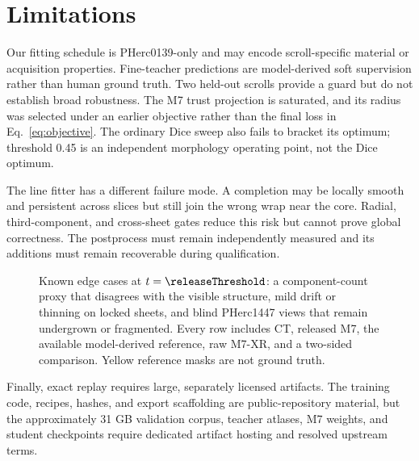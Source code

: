 \section{Limitations}
\label{sec:limitations}

Our fitting schedule is PHerc0139-only and may encode scroll-specific material
or acquisition properties.
Fine-teacher predictions are model-derived soft supervision rather than human
ground truth.
Two held-out scrolls provide a guard but do not establish broad robustness.
The M7 trust projection is saturated, and its radius was selected under an
earlier objective rather than the final loss in Eq.~\ref{eq:objective}.
The ordinary Dice sweep also fails to bracket its optimum; threshold 0.45 is an
independent morphology operating point, not the Dice optimum.

The line fitter has a different failure mode.
A completion may be locally smooth and persistent across slices but still join
the wrong wrap near the core.
Radial, third-component, and cross-sheet gates reduce this risk but cannot prove
global correctness.
The postprocess must remain independently measured and its additions must remain
recoverable during qualification.

\begin{figure}[t]
  \centering
  \caption{Known edge cases at $t=\releaseThreshold$: a component-count proxy
  that disagrees with the visible structure, mild drift or thinning on locked
  sheets, and blind PHerc1447 views that remain undergrown or fragmented.
  Every row includes CT, released M7, the available model-derived reference,
  raw M7-XR, and a two-sided comparison. Yellow reference masks are not ground
  truth.}
  \label{fig:limitations}
\end{figure}

Finally, exact replay requires large, separately licensed artifacts.
The training code, recipes, hashes, and export scaffolding are public-repository
material, but the approximately 31 GB validation corpus, teacher atlases, M7
weights, and student checkpoints require dedicated artifact hosting and resolved
upstream terms.
